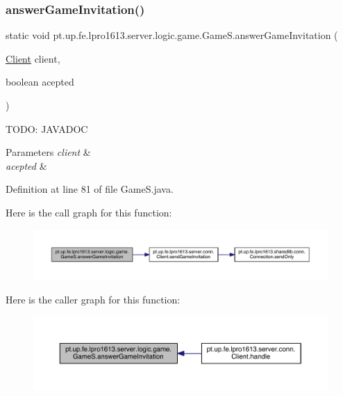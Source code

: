 \subsubsection{\texorpdfstring{answer\+Game\+Invitation()}{answerGameInvitation()}}
{\footnotesize\ttfamily static void pt.\+up.\+fe.\+lpro1613.\+server.\+logic.\+game.\+Game\+S.\+answer\+Game\+Invitation (\begin{DoxyParamCaption}\item[{\hyperlink{classpt_1_1up_1_1fe_1_1lpro1613_1_1server_1_1conn_1_1_client}{Client}}]{client,  }\item[{boolean}]{acepted }\end{DoxyParamCaption})\hspace{0.3cm}{\ttfamily [static]}}

T\+O\+DO\+: J\+A\+V\+A\+D\+OC 
\begin{DoxyParams}{Parameters}
{\em client} & \\
\hline
{\em acepted} & \\
\hline
\end{DoxyParams}


Definition at line 81 of file Game\+S.\+java.

Here is the call graph for this function\+:
\nopagebreak
\begin{figure}[H]
\begin{center}
\leavevmode
\includegraphics[width=350pt]{classpt_1_1up_1_1fe_1_1lpro1613_1_1server_1_1logic_1_1game_1_1_game_s_af7085705cb3cb78df5d0187c08a761b2_cgraph}
\end{center}
\end{figure}
Here is the caller graph for this function\+:
\nopagebreak
\begin{figure}[H]
\begin{center}
\leavevmode
\includegraphics[width=350pt]{classpt_1_1up_1_1fe_1_1lpro1613_1_1server_1_1logic_1_1game_1_1_game_s_af7085705cb3cb78df5d0187c08a761b2_icgraph}
\end{center}
\end{figure}
\hypertarget{classpt_1_1up_1_1fe_1_1lpro1613_1_1server_1_1logic_1_1game_1_1_game_s_a86e47ee40e26d36abfdac5847e423a35}{}\label{classpt_1_1up_1_1fe_1_1lpro1613_1_1server_1_1logic_1_1game_1_1_game_s_a86e47ee40e26d36abfdac5847e423a35} 
